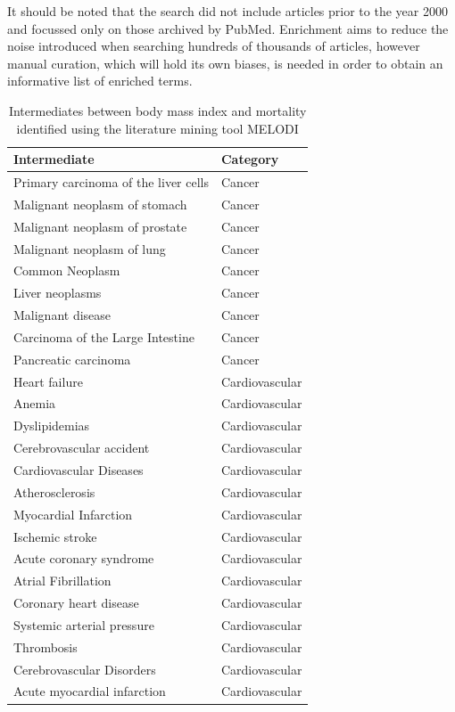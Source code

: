 \documentclass[11pt,twoside]{bristolthesis}
\begin{document}
It should be noted that the search did not include articles prior to the year 2000 and focussed only on those archived by PubMed. Enrichment aims to reduce the noise introduced when searching hundreds of thousands of articles, however manual curation, which will hold its own biases, is needed in order to obtain an informative list of enriched terms.
\begin{longtable}[t]{ll}
\caption{\label{tab:chapter1-table-MELODI}Intermediates between body mass index and mortality identified using the literature mining tool MELODI}\\
\toprule
Intermediate & Category\\
\midrule
Primary carcinoma of the liver cells & Cancer\\
Malignant neoplasm of stomach & Cancer\\
Malignant neoplasm of prostate & Cancer\\
Malignant neoplasm of lung & Cancer\\
Common Neoplasm & Cancer\\
\addlinespace
Liver neoplasms & Cancer\\
Malignant disease & Cancer\\
Carcinoma of the Large Intestine & Cancer\\
Pancreatic carcinoma & Cancer\\
Heart failure & Cardiovascular\\
\addlinespace
Anemia & Cardiovascular\\
Dyslipidemias & Cardiovascular\\
Cerebrovascular accident & Cardiovascular\\
Cardiovascular Diseases & Cardiovascular\\
Atherosclerosis & Cardiovascular\\
\addlinespace
Myocardial Infarction & Cardiovascular\\
Ischemic stroke & Cardiovascular\\
Acute coronary syndrome & Cardiovascular\\
Atrial Fibrillation & Cardiovascular\\
Coronary heart disease & Cardiovascular\\
\addlinespace
Systemic arterial pressure & Cardiovascular\\
Thrombosis & Cardiovascular\\
Cerebrovascular Disorders & Cardiovascular\\
Acute myocardial infarction & Cardiovascular\\

\end{longtable}
\end{document}
